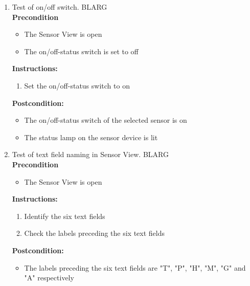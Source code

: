 \documentclass[a4paper]{article}
\newlength{\testlabellength}
\newenvironment{testlist}{\begin{enumerate}[label=\bfseries Instruction \thesubsection.\arabic* , labelindent=0pt, labelwidth=\testlabellength , leftmargin=2cm]}{\end{enumerate}}
\newenvironment{precondition}{
{\color{white}BLARG}\\ 
\textbf{Precondition}
\begin{itemize}[labelindent=0cm, labelwidth=2cm , leftmargin=1cm]
}
{\end{itemize}}
\newenvironment{instruction}{
\textbf{Instructions:}
\begin{enumerate}[label=\bfseries  \arabic*., labelindent=0cm, labelwidth=2cm , leftmargin=1cm]
}
{\end{enumerate}}
\newenvironment{postcondition}{
\textbf{Postcondition:}
\begin{itemize}[labelindent=0cm, labelwidth=2cm , leftmargin=1cm]
}
{\end{itemize}}
\begin{document}
\begin{appendices}
\begin{testlist}

	\item Test of on/off switch.
		\begin{precondition}
			\item The Sensor View is open
			\item The on/off-status switch is set to off
		\end{precondition}
		\begin{instruction}
			\item Set the on/off-status switch to on
	  	\end{instruction}
	  	\begin{postcondition}
	  		\item The on/off-status switch of the selected sensor is on
	  		\item The status lamp on the sensor device is lit
	  	\end{postcondition}

	\item Test of text field naming in Sensor View.
		\begin{precondition}
			\item The Sensor View is open
		\end{precondition}
		
		\begin{instruction}
			\item Identify the six text fields
			\item Check the labels preceding the six text fields
		\end{instruction}		
		
		\begin{postcondition}
			\item The labels preceding the six text fields are "T", "P", "H", "M", "G" and "A" respectively
		\end{postcondition}


\end{testlist}
\end{appendices}
\end{document}
